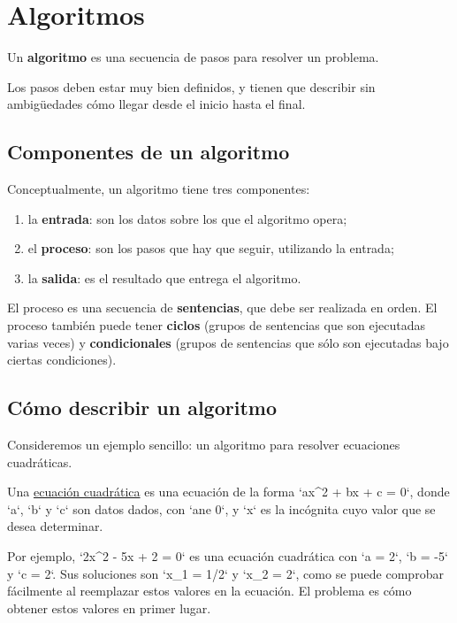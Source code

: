 \section{Algoritmos}

Un \textbf{algoritmo} es una secuencia de pasos para resolver un
problema.

Los pasos deben estar muy bien definidos, y tienen que describir sin
ambigüedades cómo llegar desde el inicio hasta el final.

\subsection{Componentes de un algoritmo}

Conceptualmente, un algoritmo tiene tres componentes:

\begin{enumerate}
\item
  la \textbf{entrada}: son los datos sobre los que el algoritmo opera;
\item
  el \textbf{proceso}: son los pasos que hay que seguir, utilizando la
  entrada;
\item
  la \textbf{salida}: es el resultado que entrega el algoritmo.
\end{enumerate}

El proceso es una secuencia de \textbf{sentencias}, que debe ser
realizada en orden. El proceso también puede tener \textbf{ciclos}
(grupos de sentencias que son ejecutadas varias veces) y
\textbf{condicionales} (grupos de sentencias que sólo son ejecutadas
bajo ciertas condiciones).

\subsection{Cómo describir un algoritmo}

Consideremos un ejemplo sencillo: un algoritmo para resolver ecuaciones
cuadráticas.

Una
\href{http://es.wikipedia.org/wiki/Ecuaci\%C3\%B3n\_de\_segundo\_grado}{ecuación
cuadrática} es una ecuación de la forma `ax\^{}2 + bx + c = 0`, donde
`a`, `b` y `c` son datos dados, con `ane 0`, y `x` es la incógnita cuyo
valor que se desea determinar.

Por ejemplo, `2x\^{}2 - 5x + 2 = 0` es una ecuación cuadrática con `a =
2`, `b = -5` y `c = 2`. Sus soluciones son `x\_1 = 1/2` y `x\_2 = 2`,
como se puede comprobar fácilmente al reemplazar estos valores en la
ecuación. El problema es cómo obtener estos valores en primer lugar.

